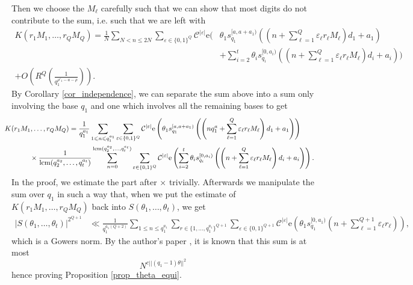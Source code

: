 \documentclass[12pt]{amsart}
\renewcommand{\leq}{\leqslant}
\DeclareMathOperator{\lcm}{lcm}
\theoremstyle{definition}
\numberwithin{equation}{section}
\newcommand\e{\mathrm{e}}
\numberwithin{equation}{section}
\begin{document}
Then we choose the $M_{\ell}$ carefully such that we can show that most digits do not contribute to the sum, i.e. such that we are left with
\begin{align*}
	K(r_1M_1,\dots, r_QM_Q) = \frac 1N \sum_{N<n\leq 2N} \sum_{\varepsilon\in \{0,1\}^Q}\mathcal{C}^{|\varepsilon|}
	\e\Bigg(&\theta_1 s_{q_1}^{[a, a+a_1)}\left(\left(n+\sum_{\ell = 1}^{Q} \varepsilon_{\ell}r_{\ell}M_{\ell}\right)d_1 			+a_1\right)\\
	&+\sum_{i=2}^{t}\theta_i s_{q_i}^{[0, a_i)} \left(\left(n+\sum_{\ell = 1}^{Q} \varepsilon_{\ell}r_{\ell}M_{\ell}\right)d_i+a_i\right)\Bigg)\\
	+ O\left(R^Q\left(\frac{1}{q_1^{\rho'_1-a-\rho}}\right)\right).&
\end{align*}
By Corollary \ref{cor_independence}, we can separate the sum above into a sum only involving the base $q_1$ and one which involves all the remaining bases to get
	\begin{align*}
	\hspace{-10pt}K(r_1M_1,\dots, r_QM_{Q}) &= \frac 1{q_1^{a_1}} \sum_{1\leq n \leq q_1^{a_1}} \sum_{\varepsilon\in \{0,1\}^Q}\mathcal{C}^{|\varepsilon|}
	\e\left(\theta_1 s_{q_1}^{[a,a+a_1)}\left(\left(nq_1^{a}+\sum_{\ell=1}^{Q}\varepsilon_{\ell}r_{\ell}M_{\ell}\right)d_1 +a_1\right)\right)\\ 
	&\hspace{-55pt}\times \frac 1{\lcm(q_2^{a_2},\dots,q_t^{a_t})} \sum_{n=0}^{\lcm(q_2^{a_2},\dots,q_t^{a_t})} \sum_{\varepsilon\in \{0,1\}^Q}\mathcal{C}^{|\varepsilon|}
	\e\left(\sum_{i=2}^{t}\theta_i s_{q_i}^{[0,a_i)}\left(\left(n+\sum_{\ell=1}^{Q}\varepsilon_{\ell}r_{\ell}M_{\ell}\right)d_i +a_i\right)\right).
\end{align*}
In the proof, we estimate the part after $\times$ trivially. Afterwards we manipulate the sum over $q_1$ in such a way that, when we put the estimate of $K(r_1M_1,\dots,r_QM_Q)$ back into $S(\theta_1,\dots,\theta_t)$, we get
\begin{align*}
	|S(\theta_1, \dots, \theta_t)|^{2^{Q+1}} &\ll \frac {1}{q_1^{a_1(Q+2)}} \sum_{1\leq n \leq q_1^{a_1}}  \sum_{r\in\{1,\dots,q_1^{a_1}\}^{Q+1}} \sum_{\varepsilon\in \{0,1\}^{Q+1}}\mathcal{C}^{|\varepsilon|}
	\e\left(\theta_1 s_{q_1}^{[0,a_1)}\left(n+\sum_{\ell=1}^{Q+1}\varepsilon_{\ell}r_{\ell}\right)\right),
\end{align*}
which is a Gowers norm. By the author's paper \cite{Jelinek2025}, it is known that this sum is at most
\[
	N^{c||(q_1-1)\theta||^2}
\]
hence proving Proposition \ref{prop_theta_equi}.
\end{document}
